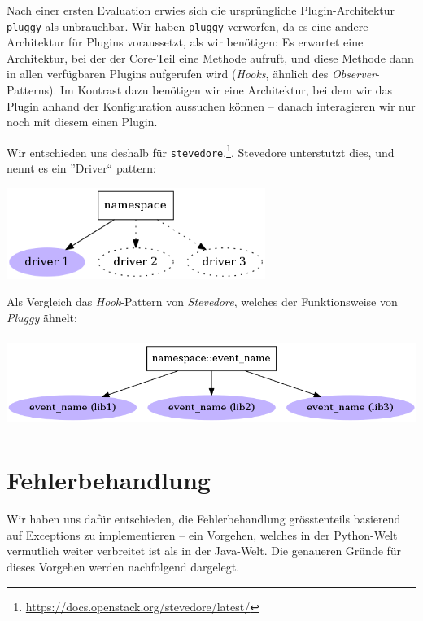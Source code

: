 \documentclass[a4paper]{article}
\let\oldsection\section
\renewcommand\section{\clearpage\oldsection}
\begin{document}
Nach einer ersten Evaluation erwies sich die ursprüngliche Plugin-Architektur \verb|pluggy| als unbrauchbar. Wir haben \verb|pluggy| verworfen, da es eine andere Architektur für Plugins
voraussetzt, als wir benötigen: Es erwartet eine Architektur, bei der der
Core-Teil eine Methode aufruft, und diese Methode dann in allen verfügbaren
Plugins aufgerufen wird (\emph{Hooks}, ähnlich des \emph{Observer}-Patterns). Im Kontrast dazu
benötigen wir eine Architektur, bei dem wir das Plugin anhand der Konfiguration
aussuchen können -- danach interagieren wir nur noch mit diesem einen Plugin.

Wir entschieden uns deshalb für \verb|stevedore|.\footnote{\url{https://docs.openstack.org/stevedore/latest/}}. Stevedore unterstutzt dies, und nennt es ein ''Driver`` pattern: \\

\begin{center}
	\includegraphics[height=8em]{img/stevedore_driver.png}
\end{center}

Als Vergleich das \emph{Hook}-Pattern von \emph{Stevedore}, welches der
Funktionsweise von \emph{Pluggy} ähnelt:

\begin{center}
	\includegraphics[height=8em]{img/stevedore_hooks.png}
\end{center}

\section{Fehlerbehandlung}
Wir haben uns dafür entschieden, die Fehlerbehandlung grösstenteils basierend
auf Exceptions zu implementieren -- ein Vorgehen, welches in der Python-Welt
vermutlich weiter verbreitet ist als in der Java-Welt. Die genaueren Gründe für
dieses Vorgehen werden nachfolgend dargelegt.
\end{document}
